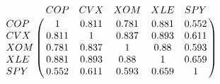 \[
\bordermatrix{
 & COP & CVX & XOM & XLE & SPY \cr
COP & 1 & 0.811 & 0.781 & 0.881 & 0.552 \cr
CVX & 0.811 & 1 & 0.837 & 0.893 & 0.611 \cr
XOM & 0.781 & 0.837 & 1 & 0.88 & 0.593 \cr
XLE & 0.881 & 0.893 & 0.88 & 1 & 0.659 \cr
SPY & 0.552 & 0.611 & 0.593 & 0.659 & 1 \cr
}
\]

